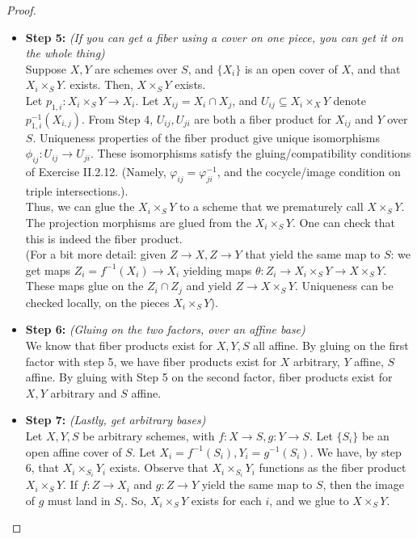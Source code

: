 \documentclass[10pt,reqno]{amsart}
\theoremstyle{definition}
\theoremstyle{remark}
\numberwithin{equation}{section}
\numberwithin{theorem}{section}
\begin{document}
\begin{proof}
\begin{itemize}
\item \textbf{Step 5:} \textit{(If you can get a fiber using a cover on one piece, you can get it on the whole thing)} \\
Suppose $X,Y$ are schemes over $S$, and $\{X_i\}$ is an open cover of $X$, and that $X_i \times_S Y$. exists. Then, $X \times_S Y$ exists.
\\

Let $p_{1,i}: X_i \times_S Y \to X_i$. Let $X_{ij} = X_i \cap X_j$, and $U_{ij} \subseteq X_i \times_X Y$ denote $p_{1,i}^{-1}(X_{i,j})$. From Step 4, $U_{ij}, U_{ji}$ are both a fiber product for $X_{ij}$ and $Y$ over $S$. Uniqueness properties of the fiber product give unique isomorphisms $\phi_{ij}: U_{ij} \to U_{ji}$. These isomorphisms satisfy the gluing/compatibility conditions of Exercise II.2.12. (Namely, $\varphi_{ij} = \varphi_{ji}^{-1}$, and the cocycle/image condition on triple intersections.).
\\

Thus, we can glue the $X_i \times_S Y$ to a scheme that we prematurely call $X \times_S Y$. The projection morphisms are glued from the $X_i \times_S Y$. One can check that this is indeed the fiber product.
\\

(For a bit more detail: given $Z \to X, Z \to Y$ that yield the same map to $S$: we get maps $Z_i = f^{-1}(X_i) \to X_i$ yielding maps $\theta: Z_i \to X_i \times_S Y \to X \times_S Y$. These maps glue on the $Z_i \cap Z_j$ and yield $Z \to X \times_S Y$. Uniqueness can be checked locally, on the pieces $X_i \times_S Y$).
\\

\item \textbf{Step 6:} \textit{(Gluing on the two factors, over an affine base)} 
\\
We know that fiber products exist for $X,Y,S$ all affine. By gluing on the first factor with step 5, we have fiber products exist for $X$ arbitrary, $Y$ affine, $S$ affine. By gluing with Step 5 on the second factor, fiber products exist for $X,Y$ arbitrary and $S$ affine.
\\

\item \textbf{Step 7:} \textit{(Lastly, get arbitrary bases)} 
\\
Let $X,Y,S$ be arbitrary schemes, with $f: X \to S, g: Y \to S$. Let $\{S_i\}$ be an open affine cover of $S$. Let $X_i = f^{-1}(S_i), Y_i = g^{-1}(S_i)$. We have, by step 6, that $X_i \times_{S_i} Y_i$ exists. Observe that $X_i \times_{S_i} Y_i$ functions as the fiber product $X_i \times_S Y$. If $f: Z \to X_i$ and $g: Z \to Y$ yield the same map to $S$, then the image of $g$ must land in $S_i$. So, $X_i \times_S Y$ exists for each $i$, and we glue to $X \times_S Y$.
\end{itemize}
\end{proof}
\end{document}
